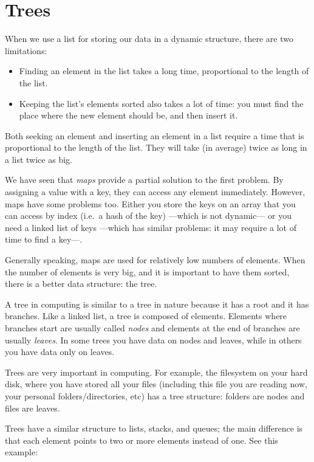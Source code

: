 
\section{Trees}
\label{sec:trees}

When we use a list for storing our data in a dynamic structure, 
there are two limitations: 

\begin{itemize}
\item Finding an element in the list takes a long time, proportional
  to the length of the list.
\item Keeping  the list's elements sorted also takes a lot of
  time: you must find the place where the new element should be, and
  then insert it. 
\end{itemize}

Both seeking an element and inserting an element in a list require a
time that is proportional to the length of the list. They will take
(in average) twice as long in a list twice as big. 

We have seen that \emph{maps} provide a partial solution to the first
problem. By assigning a value with a key, they can access any element
immediately. However, maps have some problems too. Either you store
the keys on an array that you can access by index (i.e.~a hash of the
key) ---which is not dynamic---
or you need a linked list of keys ---which has similar problems: it
may require a lot of time to find a key---. 

Generally speaking, maps are used for relatively low numbers of
elements. When the number of elements is very big, and it 
is important to have them sorted, there is a better data structure:
the tree. 

A tree in computing is similar to a tree in nature because it has a
root and it has branches. Like a linked list, a tree is composed of
elements. Elements where branches start are usually called
\emph{nodes} and elements at the end of branches are usually
\emph{leaves}. In some trees you have data on nodes and leaves, while
in others you have data only on leaves. 

Trees are very important in computing. For example, the filesystem on
your hard disk, where you have stored all your files (including this
file you are reading now, your personal folders/directories, etc) has
a tree structure: folders are nodes and files are leaves.

Trees have a similar structure to lists, stacks, and queues; the main
difference is that each element points to two or more elements instead
of one. See this example: 

